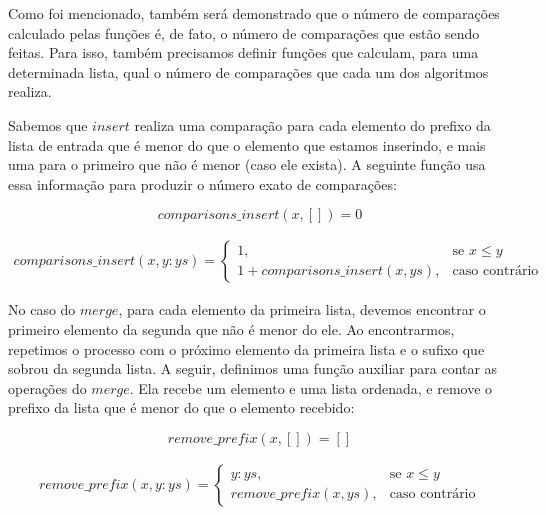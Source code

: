 \documentclass[12pt, oneside, a4paper,english,brazil]{abntex2}
\begin{document}
\qquad Como foi mencionado, tamb\'em ser\'a demonstrado que o n\'umero de compara\c{c}\~oes
calculado pelas fun\c{c}\~oes \'e, de fato, o n\'umero de compara\c{c}\~oes que est\~ao sendo feitas.
Para isso, tamb\'em precisamos definir fun\c{c}\~oes que calculam, para uma determinada lista,
qual o n\'umero de compara\c{c}\~oes que cada um dos algoritmos realiza.

\qquad Sabemos que $insert$ realiza uma compara\c{c}\~ao para cada elemento do prefixo da lista
de entrada que \'e menor do que o elemento que estamos inserindo, e mais uma para o primeiro
que n\~ao \'e menor (caso ele exista). A seguinte fun\c{c}\~ao usa essa informa\c{c}\~ao
para produzir o n\'umero exato de compara\c{c}\~oes:

\begin{equation} \label{comp_ins_base}
  comparisons\_insert(x, []) = 0
\end{equation}


\begin{equation} \label{comp_ins_ind}
\begin{split}
  comparisons\_insert(x, y : ys) =
    \begin{cases}
      1, &\text{se } x \le y \\
      1 + comparisons\_insert(x, ys), &\text{caso contr\'ario}
    \end{cases}
\end{split}
\end{equation}


\qquad No caso do $merge$, para cada elemento da primeira lista, devemos encontrar o primeiro
elemento da segunda que n\~ao \'e menor do ele. Ao encontrarmos, repetimos o processo com o pr\'oximo
elemento da primeira lista e o sufixo que sobrou da segunda lista. A seguir, definimos uma
fun\c{c}\~ao auxiliar para contar as opera\c{c}\~oes do $merge$. Ela
recebe um elemento e uma lista ordenada, e remove o prefixo da lista que \'e menor do que o elemento
recebido:

\begin{equation} \label{rem_pref_base}
  remove\_prefix(x, []) = []
\end{equation}

\begin{equation} \label{rem_pref_ind}
\begin{split}
  remove\_prefix(x, y : ys) =
    \begin{cases}
      y : ys, &\text{se } x \le y \\
      remove\_prefix(x, ys), &\text{caso contr\'ario}
    \end{cases}
\end{split}
\end{equation}
\end{document}
